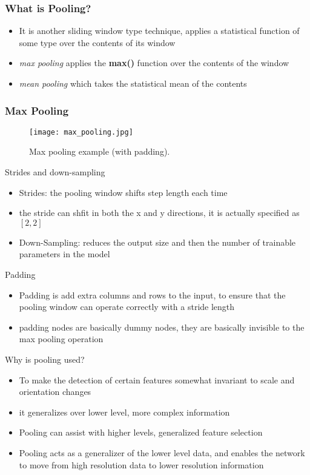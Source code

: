 \documentclass[14 pt]{beamer}
\let\olditem\item
\renewcommand{\item}{\olditem\vspace{4pt}}
\begin{document}
 \begin{frame}
      \frametitle{What is Pooling?}
      \begin{itemize}
      \item It is another sliding window type technique,
         applies a statistical
        function of some type over the contents of its window
      \item \emph{max pooling} applies the
        \textbf{max()} function over the contents of the window
      \item \emph{mean pooling} which takes the statistical mean of
        the contents
      \end{itemize}
 \end{frame}

 \begin{frame}
   \frametitle{Max Pooling}
   \begin{figure}
     \centering
     \texttt{[image: max\_pooling.jpg]}
     \caption{Max pooling example (with padding).}
   \end{figure}
 \end{frame}

 \begin{frame}{Strides and down-sampling}
   \begin{itemize}
   \item Strides:  the pooling window
   shifts step length  each time 
 \item the stride can shfit in both the x  and y directions,
   it is actually specified as $[2, 2]$
 \item Down-Sampling:  reduces the output size and then the number of trainable
   parameters in the model
 \end{itemize}
\end{frame}

\begin{frame}{Padding}
  \begin{itemize}
  \item Padding is add   extra columns and rows  to the  input,  to ensure
    that the pooling window can operate correctly with a stride length
  \item padding  nodes are basically dummy nodes, they are basically invisible to the max
  pooling operation
\end{itemize}
\end{frame}

\begin{frame}{Why is pooling used?}
  \begin{itemize}
  \item To make the detection of certain features
    somewhat invariant to scale and orientation changes
  \item  it generalizes over lower
    level, more complex information
  \item Pooling can assist with  higher levels, generalized
    feature selection
  \item Pooling acts as a generalizer of the lower level data, and enables
    the network to move from high resolution data to lower resolution
    information
  \end{itemize}
\end{frame}
\end{document}
